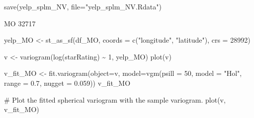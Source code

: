 \documentclass[
  12pt,
  letterpaper,
  DIV=11,
  numbers=noendperiod]{scrartcl}
\newenvironment{Shaded}{\begin{snugshade}}{\end{snugshade}}
\newcommand{\AttributeTok}[1]{\textcolor[rgb]{0.98,0.46,0.51}{#1}}
\newcommand{\CommentTok}[1]{\textcolor[rgb]{0.42,0.45,0.49}{#1}}
\newcommand{\DecValTok}[1]{\textcolor[rgb]{0.47,0.72,1.00}{#1}}
\newcommand{\FloatTok}[1]{\textcolor[rgb]{0.47,0.72,1.00}{#1}}
\newcommand{\FunctionTok}[1]{\textcolor[rgb]{0.70,0.57,0.94}{#1}}
\newcommand{\NormalTok}[1]{\textcolor[rgb]{0.88,0.89,0.91}{#1}}
\newcommand{\OtherTok}[1]{\textcolor[rgb]{0.70,0.57,0.94}{#1}}
\newcommand{\SpecialCharTok}[1]{\textcolor[rgb]{0.47,0.72,1.00}{#1}}
\newcommand{\StringTok}[1]{\textcolor[rgb]{0.62,0.80,1.00}{#1}}
\begin{document}
\begin{Shaded}
\begin{Highlighting}[]
\FunctionTok{save}\NormalTok{(yelp\_splm\_NV, }\AttributeTok{file=}\StringTok{"yelp\_splm\_NV.Rdata"}\NormalTok{)}
\end{Highlighting}
\end{Shaded}

MO 32717

\begin{Shaded}
\begin{Highlighting}[]
\NormalTok{yelp\_MO }\OtherTok{\textless{}{-}} \FunctionTok{st\_as\_sf}\NormalTok{(df\_MO, }\AttributeTok{coords =} \FunctionTok{c}\NormalTok{(}\StringTok{"longitude"}\NormalTok{, }\StringTok{"latitude"}\NormalTok{), }\AttributeTok{crs =} \DecValTok{28992}\NormalTok{)}
\end{Highlighting}
\end{Shaded}

\begin{Shaded}
\begin{Highlighting}[]
\NormalTok{v }\OtherTok{\textless{}{-}} \FunctionTok{variogram}\NormalTok{(}\FunctionTok{log}\NormalTok{(starRating) }\SpecialCharTok{\textasciitilde{}} \DecValTok{1}\NormalTok{, yelp\_MO)}
\FunctionTok{plot}\NormalTok{(v)}
\end{Highlighting}
\end{Shaded}

\begin{Shaded}
\begin{Highlighting}[]
\NormalTok{v\_fit\_MO }\OtherTok{\textless{}{-}} \FunctionTok{fit.variogram}\NormalTok{(}\AttributeTok{object=}\NormalTok{v, }
                           \AttributeTok{model=}\FunctionTok{vgm}\NormalTok{(}\AttributeTok{psill =} \DecValTok{50}\NormalTok{, }\AttributeTok{model =} \StringTok{"Hol"}\NormalTok{, }
                                     \AttributeTok{range =} \FloatTok{0.7}\NormalTok{, }\AttributeTok{nugget =} \FloatTok{0.059}\NormalTok{))}
\NormalTok{v\_fit\_MO}

\CommentTok{\# Plot the fitted spherical variogram with the sample variogram.}
\FunctionTok{plot}\NormalTok{(v, v\_fit\_MO)}
\end{Highlighting}
\end{Shaded}
\end{document}
